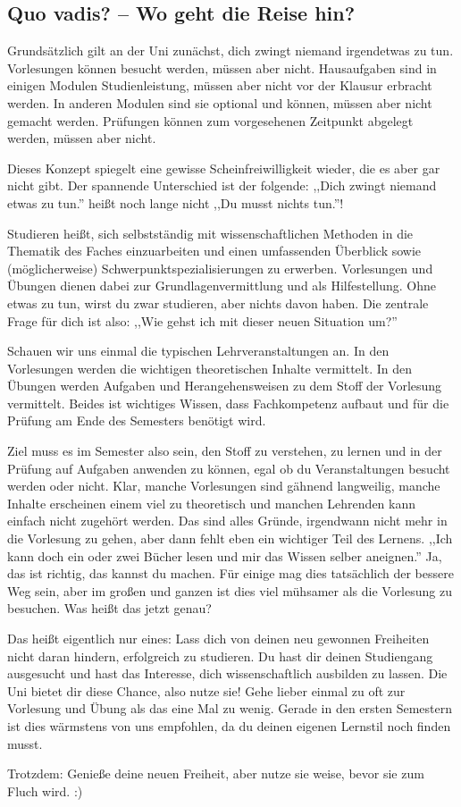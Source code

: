 
\subsection{Quo vadis? -- Wo geht die Reise hin?}

Grundsätzlich gilt an der Uni zunächst, dich zwingt niemand irgendetwas zu tun. Vorlesungen können besucht werden, müssen aber nicht. Hausaufgaben sind in einigen Modulen Studienleistung, müssen aber nicht vor der Klausur erbracht werden. In anderen Modulen sind sie optional und können, müssen aber nicht gemacht werden. Prüfungen können zum vorgesehenen Zeitpunkt abgelegt werden, müssen aber nicht.

Dieses Konzept spiegelt eine gewisse Scheinfreiwilligkeit wieder, die es aber gar nicht gibt. Der spannende Unterschied ist der folgende: ,,Dich zwingt niemand etwas zu tun.'' heißt noch lange nicht ,,Du musst nichts tun.''! 

Studieren heißt, sich selbstständig mit wissenschaftlichen Methoden in die Thematik des Faches einzuarbeiten und einen umfassenden Überblick sowie (möglicherweise) Schwerpunktspezialisierungen zu erwerben. Vorlesungen und Übungen dienen dabei zur Grundlagenvermittlung und als Hilfestellung. Ohne etwas zu tun, wirst du zwar studieren, aber nichts davon haben. Die zentrale Frage für dich ist also: ,,Wie gehst ich mit dieser neuen Situation um?''

Schauen wir uns einmal die typischen Lehrveranstaltungen an. In den Vorlesungen werden die wichtigen theoretischen Inhalte vermittelt. In den Übungen werden Aufgaben und Herangehensweisen zu dem Stoff der Vorlesung vermittelt. Beides ist wichtiges Wissen, dass Fachkompetenz aufbaut und für die Prüfung am Ende des Semesters benötigt wird.

Ziel muss es im Semester also sein, den Stoff zu verstehen, zu lernen und in der Prüfung auf Aufgaben anwenden zu können, egal ob du Veranstaltungen besucht werden oder nicht. Klar, manche Vorlesungen sind gähnend langweilig, manche Inhalte erscheinen einem viel zu theoretisch und manchen Lehrenden kann einfach nicht zugehört werden. Das sind alles Gründe, irgendwann nicht mehr in die Vorlesung zu gehen, aber dann fehlt eben ein wichtiger Teil des Lernens. ,,Ich kann doch ein oder zwei Bücher lesen und mir das Wissen selber aneignen.'' Ja, das ist richtig, das kannst du machen. Für einige mag dies tatsächlich der bessere Weg sein, aber im großen und ganzen ist dies viel mühsamer als die Vorlesung zu besuchen. Was heißt das jetzt genau? 

Das heißt eigentlich nur eines: Lass dich von deinen neu gewonnen Freiheiten nicht daran hindern, erfolgreich zu studieren. Du hast dir deinen Studiengang ausgesucht und hast das Interesse, dich wissenschaftlich ausbilden zu lassen. Die Uni bietet dir diese Chance, also nutze sie! Gehe lieber einmal zu oft zur Vorlesung und Übung als das eine Mal zu wenig. Gerade in den ersten Semestern ist dies wärmstens von uns empfohlen, da du deinen eigenen Lernstil noch finden musst.

Trotzdem: Genieße deine neuen Freiheit, aber nutze sie weise, bevor sie zum Fluch wird. :)
